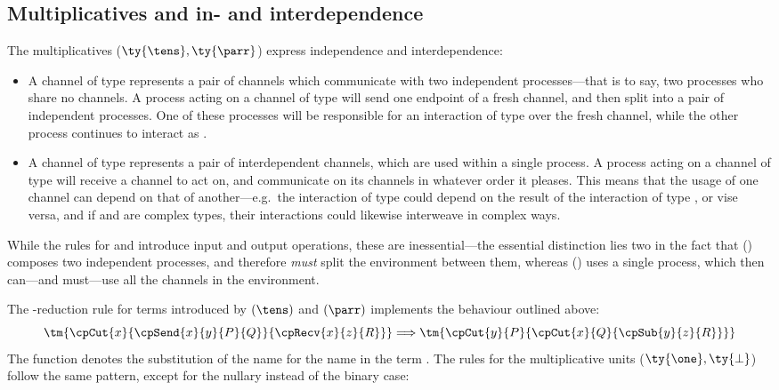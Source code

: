 \documentclass[UKenglish]{llncs}
\begin{document}
\subsection{Multiplicatives and in- and interdependence}
\label{sec:cp-multiplicatives}
The multiplicatives ($\ty{\tens}, \ty{\parr}$) express independence and
interdependence:
\begin{itemize}
\item
  A channel of type  represents a pair of channels which
  communicate with two independent processes---that is to say, two
  processes who share no channels.
  A process acting on a channel of type  will send one endpoint of
  a fresh channel, and then split into a pair of independent processes.
  One of these processes will be responsible for an interaction of type 
  over the fresh channel, while the other process continues to interact as
  .
\item
  A channel of type  represents a pair of interdependent channels,
  which are used within a single process.
  A process acting on a channel of type  will receive a channel to
  act on, and communicate on its channels in whatever order it pleases.
  This means that the usage of one channel can depend on that of
  another---e.g.\ the interaction of type  could depend on the result of
  the interaction of type , or vise versa, and if  and  are
  complex types, their interactions could likewise interweave in complex ways.
\end{itemize}
While the rules for \ty{\tens} and \ty{\parr} introduce input and output
operations, these are inessential---the essential distinction lies two in the
fact that (\tens) composes two independent processes, and therefore \emph{must}
split the environment between them, whereas (\parr) uses a single process, which
then can---and must---use all the channels in the environment.
\begin{center}
  \cpInfTens
  \cpInfParr
\end{center}
The \textbeta-reduction rule for terms introduced by $(\tens)$ and $(\parr)$
implements the behaviour outlined above:
\[
  \tm{\cpCut{x}{\cpSend{x}{y}{P}{Q}}{\cpRecv{x}{z}{R}}}
  \Longrightarrow
  \tm{\cpCut{y}{P}{\cpCut{x}{Q}{\cpSub{y}{z}{R}}}}
\]
The function  denotes the substitution of the name 
for the name  in the term .
%
The rules for the multiplicative units ($\ty{\one}, \ty{\bot}$) follow the same
pattern, except for the nullary instead of the binary case:
\end{document}
